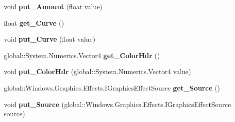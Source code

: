 \begin{DoxyCompactItemize}
void {\bfseries put\+\_\+\+Amount} (float value)
\item 
\mbox{\label{interface_microsoft_1_1_graphics_1_1_canvas_1_1_effects_1_1_i_vignette_effect_a7515b9695e0da2e84580caaca06850d6}} 
float {\bfseries get\+\_\+\+Curve} ()
\item 
\mbox{\label{interface_microsoft_1_1_graphics_1_1_canvas_1_1_effects_1_1_i_vignette_effect_a6514d64c435f93fa29dbabb96408918c}} 
void {\bfseries put\+\_\+\+Curve} (float value)
\item 
\mbox{\label{interface_microsoft_1_1_graphics_1_1_canvas_1_1_effects_1_1_i_vignette_effect_af0e049095b6661e7df4650bf921e4519}} 
global\+::\+System.\+Numerics.\+Vector4 {\bfseries get\+\_\+\+Color\+Hdr} ()
\item 
\mbox{\label{interface_microsoft_1_1_graphics_1_1_canvas_1_1_effects_1_1_i_vignette_effect_af7ab68336fa2568bdeb6a1e4594d8797}} 
void {\bfseries put\+\_\+\+Color\+Hdr} (global\+::\+System.\+Numerics.\+Vector4 value)
\item 
\mbox{\label{interface_microsoft_1_1_graphics_1_1_canvas_1_1_effects_1_1_i_vignette_effect_a83f6439e374d05019388d748dead7262}} 
global\+::\+Windows.\+Graphics.\+Effects.\+I\+Graphics\+Effect\+Source {\bfseries get\+\_\+\+Source} ()
\item 
\mbox{\label{interface_microsoft_1_1_graphics_1_1_canvas_1_1_effects_1_1_i_vignette_effect_ac5f66cc2133f986942004288fa71aaf8}} 
void {\bfseries put\+\_\+\+Source} (global\+::\+Windows.\+Graphics.\+Effects.\+I\+Graphics\+Effect\+Source source)
\item 
\mbox{\label{interface_microsoft_1_1_graphics_1_1_canvas_1_1_effects_1_1_i_vignette_effect_ae0ba5605c3bac68e4d10ccd4416414bb}} 

\end{DoxyCompactItemize}
